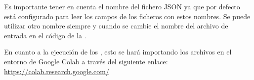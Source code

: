 Es importante tener en cuenta el nombre del fichero JSON ya que por defecto está configurado para leer los campos de los ficheros con estos nombres.
Se puede utilizar otro nombre siempre y cuando se cambie el nombre del archivo de entrada en el código de la .

En cuanto a la ejecución de los , esto se hará importando los archivos  en el entorno de Google Colab a través del siguiente enlace:
\newline
\url{https://colab.research.google.com/}


